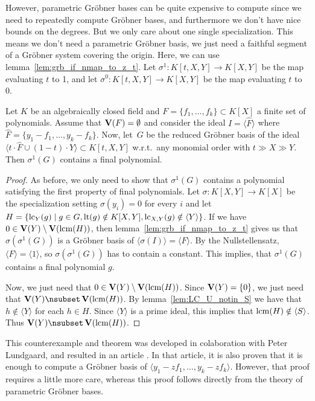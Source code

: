 However, parametric Gröbner bases can be quite expensive to compute since we need to repeatedly compute Gröbner bases, and furthermore we don't have nice bounds on the degrees. But we only care about one single specialization. This means we don't need a parametric Gröbner basis, we just need a faithful segment of a Gröbner system covering the origin. Here, we can use lemma~\ref{lem:grb_if_nmap_to_z_t}. Let $\sigma^{1} : K[t, X, Y] \to K[X, Y]$ be the map evaluating $t$ to 1, and let $\sigma^{0} : K[t, X, Y] \to K[X, Y]$ be the map evaluating $t$ to 0.

\begin{theorem}
  Let $K$ be an algebraically closed field and $F = \{f_{1}, \dots, f_{k}\} \subset K[X]$ a finite set of polynomials. Assume that $\operatorname{\mathbf V}(F) = \emptyset$ and consider the ideal $I = \langle \hat F \rangle$ where $\hat F = \{y_{1} - f_{1}, \dots, y_{k} - f_{k}\}$. Now, let $\,G$ be the reduced Gröbner basis of the ideal $\langle t \cdot \hat F \cup (1 - t) \cdot Y \rangle \subset K[t, X, Y]$ w.r.t.\ any monomial order with $t \gg X \gg Y$. Then $\sigma^{1}(G)$ contains a final polynomial.
\end{theorem}
\begin{proof}
  As before, we only need to show that $\sigma^{1}(G)$ contains a polynomial satisfying the first property of final polynomials. Let $\sigma : K[X, Y] \to K[X]$ be the specialization setting $\sigma(y_{i}) = 0$ for every $i$ and let $H = \{\operatorname{lc}_{Y}(g) \mid g \in G, \operatorname{lt}(g) \notin K[X, Y], \operatorname{lc}_{X, Y}(g) \notin \langle Y \rangle\}$. If we have $0 \in \operatorname{\mathbf V}(Y) \setminus \operatorname{\mathbf V}(\operatorname{lcm}(H))$, then lemma~\ref{lem:grb_if_nmap_to_z_t} gives us that $\sigma(\sigma^{1}(G))$ is a Gröbner basis of $\langle \sigma(I) \rangle = \langle F \rangle$. By the Nullstellensatz, $\langle F \rangle = \langle 1 \rangle$, so $\sigma(\sigma^{1}(G))$ has to contain a constant. This implies, that $\sigma^{1}(G)$ contains a final polynomial $g$.

  Now, we just need that $0 \in \operatorname{\mathbf V}(Y) \setminus \operatorname{\mathbf V}(\operatorname{lcm}(H))$. Since $\operatorname{\mathbf V}(Y) = \{0\}$, we just need that $\V(Y) \nsubset \V(\lcm(H))$. By lemma~\ref{lem:LC_U_notin_S} we have that $h \notin \langle Y \rangle$ for each $h \in H$. Since $\langle Y \rangle$ is a prime ideal, this implies that $\operatorname{lcm}(H) \notin \langle S \rangle$. Thus $\V(Y) \nsubset \V(\lcm(H))$.
\end{proof}

This counterexample and theorem was developed in colaboration with Peter Lundgaard, and resulted in an article \cite{Lundgaard_Poulsen}. In that article, it is also proven that it is enough to compute a Gröbner basis of $\langle y_{1} - z f_{1}, \dots, y_{k} - z f_{k} \rangle$. However, that proof requires a little more care, whereas this proof follows directly from the theory of parametric Gröbner bases.
